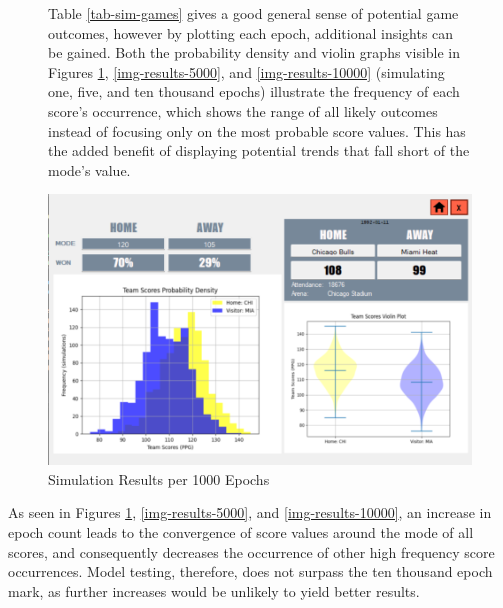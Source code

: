 \documentclass{thesis-ekf}
\theoremstyle{definition}
\theoremstyle{remark}
\begin{document}
\begin{figure}[th!]
	\begin{minipage}{0.38\textwidth}
		Table \ref{tab-sim-games} gives a good general sense of potential game outcomes, however by plotting each epoch, additional insights can be gained. Both the probability density and violin graphs visible in Figures \ref{img-results-1000}, \ref{img-results-5000}, and \ref{img-results-10000} (simulating one, five, and ten thousand epochs) illustrate the frequency of each score's occurrence, which shows the range of all likely outcomes instead of focusing only on the most probable score values. This has the added benefit of displaying potential trends that fall short of the mode's value.
	\end{minipage}
	\hfill
	\begin{minipage}{0.6\textwidth}
		\centering
		\includegraphics[width=\textwidth]{img/results/chi_mia_1000}
		\caption{Simulation Results per 1000 Epochs}
		\label{img-results-1000}
	\end{minipage}
\end{figure}

As seen in Figures \ref{img-results-1000}, \ref{img-results-5000}, and \ref{img-results-10000}, an increase in epoch count leads to the convergence of score values around the mode of all scores, and consequently decreases the occurrence of other high frequency score occurrences. Model testing, therefore, does not surpass the ten thousand epoch mark, as further increases would be unlikely to yield better results. 
\end{document}
